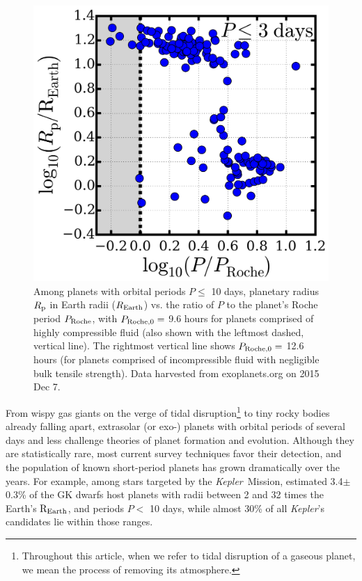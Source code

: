 \documentclass{svjour3}                     %
\newcommand{\kepler}{\emph{Kepler}}
\begin{document}
\begin{figure}
\includegraphics[width=\textwidth]{P-PRoche}
\caption{Among planets with orbital periods $P \le $ 10 days, planetary radius $R_{\rm p}$ in Earth radii ($R_{\rm Earth}$) vs. the ratio of $P$ to the planet's Roche period $P_{\rm Roche}$, with $P_{\rm Roche, 0} =$ 9.6 hours for planets comprised of highly compressible fluid (also shown with the leftmost dashed, vertical line). The rightmost vertical line shows $P_{\rm Roche, 0} =$ 12.6 hours (for planets comprised of incompressible fluid with negligible bulk tensile strength). Data harvested from exoplanets.org on 2015 Dec 7.}
\label{fig:P-PRoche}
\end{figure}

From wispy gas giants on the verge of tidal disruption\footnote{Throughout this article, when we refer to tidal disruption of a gaseous planet, we mean the process of removing its atmosphere.} to tiny rocky bodies already falling apart, extrasolar (or exo-) planets with orbital periods of several days and less challenge theories of planet formation and evolution. Although they are statistically rare, most current survey techniques favor their detection, and the population of known short-period planets has grown dramatically over the years. For example, among stars targeted by the \kepler\ Mission, \cite{Howard2010Occurrence} estimated 3.4$\pm$0.3\% of the GK dwarfs host planets with radii between 2 and 32 times the Earth's ${\rm R_{Earth}}$, and periods $P <$ 10 days, while almost 30\% of all \kepler's candidates lie within those ranges. 
\end{document}
